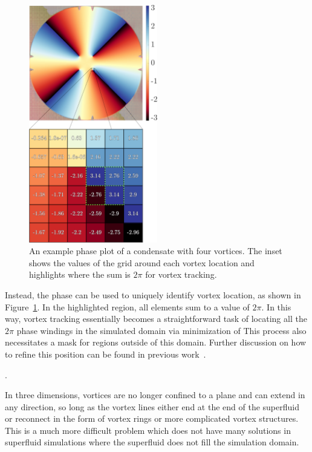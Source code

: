 \begin{figure}
\center \includegraphics[width = 0.5\textwidth]{data/gpu/vortex_tracking/phi_grid.png}
\caption{An example phase plot of a condensate with four vortices.
The inset shows the values of the grid around each vortex location and highlights where the sum is $2\pi$ for vortex tracking.
}
\label{fig:phase}
\end{figure}

Instead, the phase can be used to uniquely identify vortex location, as shown in Figure~\ref{fig:phase}.
In the highlighted region, all elements sum to a value of $2\pi$.
In this way, vortex tracking essentially becomes a straightforward task of locating all the $2\pi$ phase windings in the simulated domain via minimization of
This process also necessitates a mask for regions outside of this domain.
Further discussion on how to refine this position can be found in previous work~\cite{o2017, docs}.

.

In three dimensions, vortices are no longer confined to a plane and can extend in any direction, so long as the vortex lines either end at the end of the superfluid or reconnect in the form of vortex rings or more complicated vortex structures.
This is a much more difficult problem which does not have many solutions in superfluid simulations where the superfluid does not fill the simulation domain.

